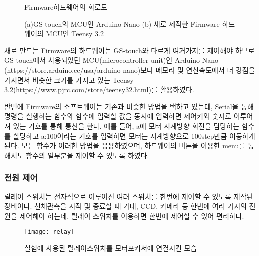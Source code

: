 \begin{figure}[h]
	\begin{center}
	\end{center}
	\caption{Firmware하드웨어의 회로도}
	\label{circuit01}
\end{figure}

\begin{figure}[ht]
	\begin{center}
	\end{center}
\caption{(a)GS-touch의 MCU인 Arduino Nano (b) 새로 제작한 Firmware 하드웨어의 MCU인 Teensy 3.2}
\label{mcu}
\end{figure}

 새로 만드는 Firmware의 하드웨어는 GS-touch와 다르게 여거가지를 제어해야 하므로 GS-touch에서 사용되었던 MCU(microcontroller unit)인 Arduino Nano (https://store.arduino.cc/usa/arduino-nano)보다 메모리 및 연산속도에서 더 강점을 가지면서 비슷한 크기를 가지고 있는 Teensy 3.2(https://www.pjrc.com/store/teensy32.html)를 활용하였다. 

반면에 Firmware의 소프트웨어는 기존과 비슷한 방법을 택하고 있는데, Serial을 통해 명령을 실행하는 함수와 함수에 입력할 값을 동시에 입력하면 제어키와 숫자로 이루어져 있는 기호를 통해 통신을 한다. 예를 들어, a에 모터 시계방향 회전을 담당하는 함수를 할당하고 a:100이라는 기호를 입력하면 모터는 시계방향으로 100step만큼 이동하게 된다. 모든 함수가 이러한 방법을 응용하였으며, 하드웨어의 버튼을 이용한 menu를 통해서도 함수의 일부분을 제어할 수 있도록 하였다.

\subsubsection{전원 제어}

릴레이 스위치는 전자석으로 이루어진 여러 스위치를 한번에 제어할 수 있도록 제작된 장비이다. 천체관측을 시작 및 종료할 때 가대, CCD, 카메라 등 한번에 여러 가지의 전원을 제어해야 하는데, 릴레이 스위치를 이용하면 한번에 제어할 수 있어 편리하다. 

\begin{figure}[h]
	\begin{center}
		\texttt{[image: relay]}
	\end{center}
	\caption{실험에 사용된 릴레이스위치를 모터포커서에 연결시킨 모습}
	\label{relay}
\end{figure}



